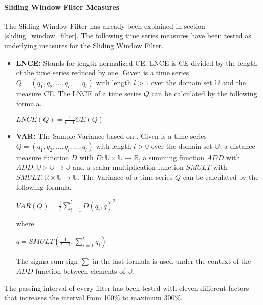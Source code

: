 \paragraph{Sliding Window Filter Measures} \label{sliding_window_filter_measures}
The Sliding Window Filter has already been explained in section \ref{sliding_window_filter}. The following time series
measures have been tested as underlying measures for the Sliding Window Filter.

\begin{itemize}
    \item \textbf{LNCE:} Stands for length normalized CE. LNCE is CE divided by the length of the time series reduced by
    one. Given is a time series $Q = (q_1, q_2, \dots, q_i, \dots, q_l)$ with length $l > 1$ over the domain set
    $\mathbb{U}$ and the measure CE. The LNCE of a time series $Q$ can be calculated by the following formula.
    \begin{center}
        $LNCE(Q) = \frac{1}{l - 1}CE(Q)$
    \end{center}
    \item \textbf{VAR:} The Sample Variance based on \cite{chan1983algorithms}. Given is a time series
    $Q = (q_1, q_2, \dots, q_i, \dots, q_l)$ with length $l > 0$ over the domain set $\mathbb{U}$, a distance measure
    function $D$ with $D: \mathbb{U} \times \mathbb{U} \to \mathbb{R}$, a summing function $ADD$ with
    $ADD: \mathbb{U} \times \mathbb{U} \to \mathbb{U}$ and a scalar multiplication function $SMULT$ with
    $SMULT: \mathbb{R} \times \mathbb{U} \to \mathbb{U}$. The Variance of a time series $Q$ can be calculated by the
    following formula.
    \begin{center}
        $VAR(Q) = \frac{1}{l}\sum \limits_{i=1}^{l} D(q_i, \bar{q})^2$
    \end{center}
    where
    \begin{center}
        $\bar{q} = SMULT(\frac{1}{l-1}, \sum \limits_{i=1}^{l} q_i)$
    \end{center}
    The sigma sum sign $\sum$ in the last formula is used under the context of the $ADD$ function between elements of
    $\mathbb{U}$.
\end{itemize}
The passing interval of every filter has been tested with eleven different factors that increases the interval from
100\% to maximum 300\%.
